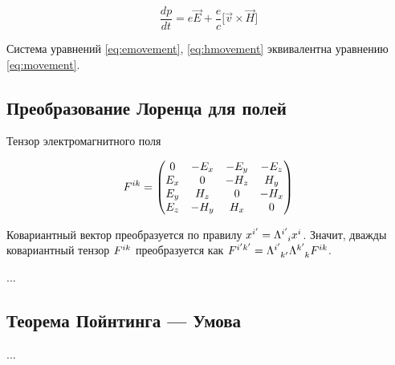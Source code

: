 \documentclass{article}
\begin{document}
\begin{equation}\label{eq:hmovement}
    \frac{dp}{dt}=e\vec{E}+\frac{e}{c}\lbrack\vec{v}\times\vec{H}\rbrack
\end{equation}

Система уравнений \eqref{eq:emovement}, \eqref{eq:hmovement} эквивалентна уравнению \eqref{eq:movement}.

\subsection{Преобразование Лоренца для полей}

Тензор электромагнитного поля

\begin{equation}
    \tensor{F}{^i^k} =
    \begin{pmatrix}
        0 & -E_x & -E_y & -E_z \\
        E_x & 0 & -H_z & H_y \\
        E_y & H_z & 0 & -H_x \\
        E_z & -H_y & H_x & 0
    \end{pmatrix}
\end{equation}

Ковариантный вектор преобразуется по правилу $x^{i'}=\tensor{\Lambda}{^{i'}_{i}} x^i$. Значит, дважды ковариантный тензор $\tensor{F}{^i^k}$ преобразуется как $\tensor{F}{^{i'}^{k'}}=\tensor{\Lambda}{^{i'}_{k'}}\tensor{\Lambda}{^{k'}_{k}} \tensor{F}{^i^k}$.

...

\subsection{Теорема Пойнтинга --- Умова}

...
\end{document}
